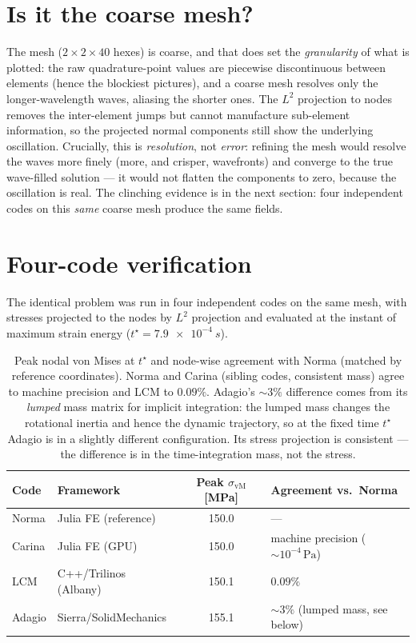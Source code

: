 \documentclass[11pt]{article}
\newcommand{\sib}[1]{\,\mathrm{#1}}
\begin{document}
\section{Is it the coarse mesh?}
The mesh ($2\times2\times40$ hexes) is coarse, and that does set the
\emph{granularity} of what is plotted: the raw quadrature-point values are
piecewise discontinuous between elements (hence the blockiest pictures), and a
coarse mesh resolves only the longer-wavelength waves, aliasing the shorter
ones. The $L^2$ projection to nodes removes the inter-element jumps but cannot
manufacture sub-element information, so the projected normal components still
show the underlying oscillation. Crucially, this is \emph{resolution}, not
\emph{error}: refining the mesh would resolve the waves more finely (more, and
crisper, wavefronts) and converge to the true wave-filled solution --- it would
not flatten the components to zero, because the oscillation is real. The
clinching evidence is in the next section: four independent codes on this
\emph{same} coarse mesh produce the same fields.

\section{Four-code verification}
The identical problem was run in four independent codes on the same mesh, with
stresses projected to the nodes by $L^2$ projection and evaluated at the instant
of maximum strain energy ($t^\star=\SI{7.9e-4}{s}$).

\begin{table}[h]
\centering
\begin{tabular}{llcl}
\toprule
Code & Framework & Peak $\sigma_{\mathrm{vM}}$ [MPa] & Agreement vs.\ Norma \\
\midrule
Norma  & Julia FE (reference)         & 150.0 & --- \\
Carina & Julia FE (GPU)               & 150.0 & machine precision ($\sim\!10^{-4}\sib{Pa}$) \\
LCM    & C++/Trilinos (Albany)        & 150.1 & $0.09\%$ \\
Adagio & Sierra/SolidMechanics        & 155.1 & $\sim\!3\%$ (lumped mass, see below) \\
\bottomrule
\end{tabular}
\caption{Peak nodal von Mises at $t^\star$ and node-wise agreement with Norma
(matched by reference coordinates). Norma and Carina (sibling codes, consistent
mass) agree to machine precision and LCM to $0.09\%$. Adagio's $\sim\!3\%$
difference comes from its \emph{lumped} mass matrix for implicit integration:
the lumped mass changes the rotational inertia and hence the dynamic trajectory,
so at the fixed time $t^\star$ Adagio is in a slightly different configuration.
Its stress projection is consistent --- the difference is in the
time-integration mass, not the stress.}
\end{table}
\end{document}
